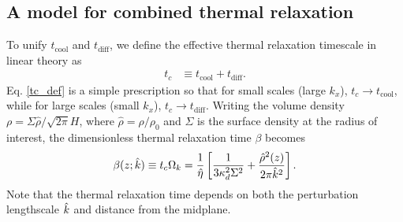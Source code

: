 \subsection{A model for combined thermal relaxation}\label{toy_relax}
To unify $t_\mathrm{cool}$ and $t_\mathrm{diff}$, we define the
effective thermal relaxation timescale in linear theory as
\begin{align}\label{tc_def}
  t_c &\equiv t_\mathrm{cool} + t _\mathrm{diff}. %
\end{align}
Eq. \ref{tc_def} is a simple prescription so
that for small scales (large $k_x$), $t_c\to t_\mathrm{cool}$, while
for large scales (small $k_x$), $t_c\to t_\mathrm{diff}$. Writing the
volume density $\rho = \Sigma\hat{\rho}/\sqrt{2\pi}H$, where
$\hat{\rho} = \rho/\rho_0$ and $\Sigma$ is the surface density at the
radius of interest, the 
dimensionless thermal
relaxation time $\beta$ becomes 
\begin{align}\label{real_beta}
  \beta(z;\hat{k}) \equiv t_c\Omega_k =
  \frac{1}{\hat{\eta}}\left[\frac{1}{3\kappa_d^2\Sigma^2} 
    + \frac{\hat{\rho}^2(z)}{2\pi \hat{k}^2}\right].
\end{align}
Note that the thermal relaxation time depends on both the perturbation lengthscale $\hat{k}$ 
and distance from the midplane. %

